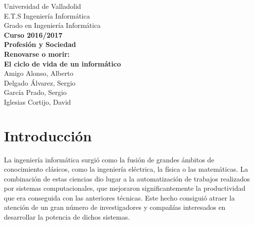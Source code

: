 \documentclass[12pt, a4paper]{report}
\begin{document}

	\begin{titlepage}
        \raggedleft
        {
        	\Large Universidad de Valladolid \\
        	E.T.S Ingeniería Informática \\
        	Grado en Ingeniería Informática\\
        }
        \vspace{4cm}
        \centering
        {
        	\bf \LARGE Curso 2016/2017 \\
        	 Profesión y Sociedad \\
            
             \vspace{1cm}
        	 Renovarse o morir: \\
             El ciclo de vida de un informático\\
        }
        \vspace{10cm}
        \raggedleft
        {
        	\Large 
            Amigo Alonso, Alberto \\
        	Delgado Álvarez, Sergio \\
            García Prado, Sergio \\
            Iglesias Cortijo, David \\
        }

  \end{titlepage}
  
	\newpage
    \tableofcontents

  	\newpage
  	\section{Introducción}
    	\paragraph{}
        La ingeniería informática surgió como la fusión de grandes ámbitos de conocimiento clásicos, como la ingeniería eléctrica, la física o las matemáticas. La combinación de estas ciencias dio lugar a la automatización de trabajos realizados por sistemas computacionales, que mejoraron significantemente la productividad que era conseguida con las anteriores técnicas. Este hecho consiguió atraer la atención de un gran número de investigadores y compañías interesados en desarrollar la potencia de dichos sistemas. 
        
\end{document}
